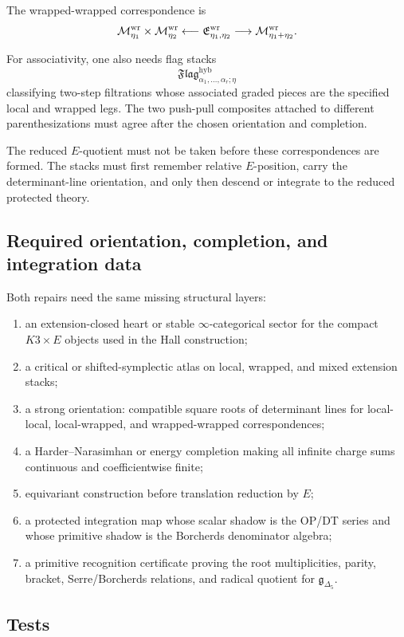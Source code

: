 The wrapped-wrapped correspondence is
\[
\mathcal M^{\mathrm{wr}}_{\eta_1}\times\mathcal M^{\mathrm{wr}}_{\eta_2}
\longleftarrow
\mathfrak E^{\mathrm{wr}}_{\eta_1,\eta_2}
\longrightarrow
\mathcal M^{\mathrm{wr}}_{\eta_1+\eta_2}.
\]

For associativity, one also needs flag stacks
\[
\mathfrak{Flag}^{\mathrm{hyb}}_{\alpha_1,\ldots,\alpha_r;\eta}
\]
classifying two-step filtrations whose associated graded pieces are the
specified local and wrapped legs.  The two push-pull composites attached
to different parenthesizations must agree after the chosen orientation
and completion.

The reduced \(E\)-quotient must not be taken before these
correspondences are formed.  The stacks must first remember relative
\(E\)-position, carry the determinant-line orientation, and only then
descend or integrate to the reduced protected theory.

\subsection{Required orientation, completion, and integration data}

Both repairs need the same missing structural layers:
\begin{enumerate}
\item an extension-closed heart or stable \(\infty\)-categorical sector
for the compact \(K3\times E\) objects used in the Hall construction;
\item a critical or shifted-symplectic atlas on local, wrapped, and
mixed extension stacks;
\item a strong orientation: compatible square roots of determinant
lines for local-local, local-wrapped, and wrapped-wrapped
correspondences;
\item a Harder--Narasimhan or energy completion making all infinite
charge sums continuous and coefficientwise finite;
\item equivariant construction before translation reduction by \(E\);
\item a protected integration map whose scalar shadow is the OP/DT
series and whose primitive shadow is the Borcherds denominator algebra;
\item a primitive recognition certificate proving the root
multiplicities, parity, bracket, Serre/Borcherds relations, and radical
quotient for \(\mathfrak g_{\Delta_5}\).
\end{enumerate}

\subsection{Tests}

